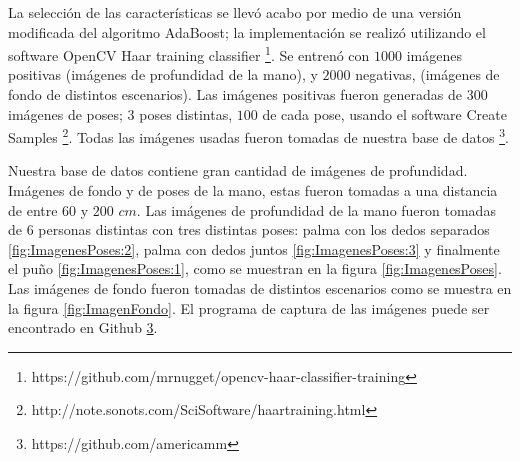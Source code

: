 La selección de las características se llev\'o acabo por medio de una versión modificada del algoritmo AdaBoost; la implementaci\'on se realiz\'o utilizando el software OpenCV Haar training classifier \footnote{https://github.com/mrnugget/opencv-haar-classifier-training}. Se entren\'o con $1000$ imágenes positivas (imágenes de profundidad de la mano), y $2000$ negativas, (imágenes de fondo de distintos escenarios). Las imágenes positivas fueron generadas de $300$ imágenes de poses; $3$ poses distintas, $100$ de cada pose, usando el software Create Samples \footnote{http://note.sonots.com/SciSoftware/haartraining.html}. Todas las imágenes usadas fueron tomadas de nuestra base de  datos \footnote{\label{myrepo} https://github.com/americamm}.

Nuestra base de datos contiene gran cantidad de imágenes de profundidad. Imágenes de fondo y de poses de la mano, estas fueron tomadas a una distancia de entre $60$ y $200$ $cm$. Las imágenes de profundidad de la mano fueron tomadas de $6$ personas distintas con tres distintas poses: palma con los dedos separados \ref{fig:ImagenesPoses:2}, palma con dedos juntos \ref{fig:ImagenesPoses:3} y finalmente el pu\~no \ref{fig:ImagenesPoses:1}, como se muestran en la figura \ref{fig:ImagenesPoses}. Las imágenes de fondo fueron tomadas de distintos escenarios como se muestra en la figura \ref{fig:ImagenFondo}. El programa de captura de las imágenes puede ser encontrado en Github \ref{myrepo}.  

